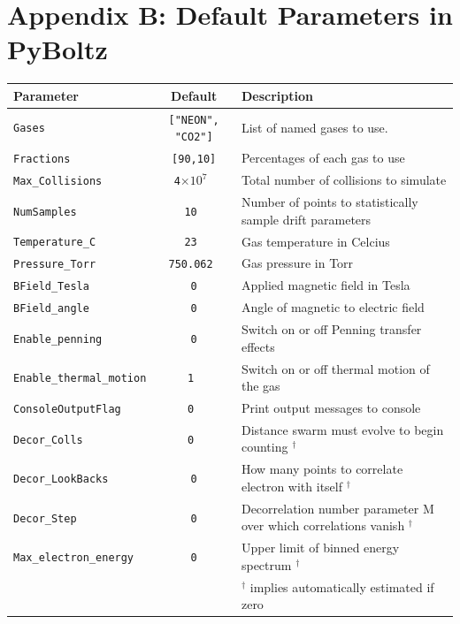\documentclass[3p,11pt]{elsarticle}
\begin{document}
\section*{Appendix B: Default Parameters in PyBoltz}
\begin{center}

\begin{turn}{90}
\begin{tabular}{ |l | c |l| }
  \hline			
  {\bf Parameter} & {\bf Default}  & {\bf Description} \\
  \hline
  {\tt Gases} & {\tt ["NEON", "CO2"]} & List of named gases to use. \\
  {\tt Fractions} & \tt{ [90,10] }& Percentages of each gas to use\\
  {\tt Max\_Collisions} & {\tt 4$\times 10^7$ }& Total number of collisions to simulate \\
  {\tt NumSamples}  & {\tt 10 }& Number of points to statistically sample drift parameters \\
  {\tt Temperature\_C} &{\tt  23 }& Gas temperature in Celcius \\
  {\tt Pressure\_Torr} & {\tt 750.062 }& Gas pressure in Torr \\
  {\tt BField\_Tesla} & {\tt 0} & Applied magnetic field in Tesla \\
  {\tt BField\_angle} & {\tt 0} & Angle of magnetic to electric field \\
  {\tt Enable\_penning} & {\tt 0} & Switch on or off Penning transfer effects \\
  {\tt Enable\_thermal\_motion} & {\tt 1 }& Switch on or off thermal motion of the gas \\
  {\tt ConsoleOutputFlag} &{\tt  0 }& Print output messages to console \\
  {\tt Decor\_Colls} & {\tt 0 }& Distance swarm must evolve to begin counting $^{\dagger }$ \\
  {\tt Decor\_LookBacks} & {\tt 0} & How many points to correlate electron with itself $^{\dagger}$\\
  {\tt Decor\_Step} &{\tt  0} & Decorrelation number parameter M over which correlations vanish  $^{\dagger }$\\
  {\tt Max\_electron\_energy} & {\tt 0} & Upper limit of binned energy spectrum  $^{\dagger }$\\
  \hline			
  & & $^{\dagger}$ implies automatically estimated if zero \\
  \hline			

\end{tabular}
\end{turn}
\end{center}
\end{document}
